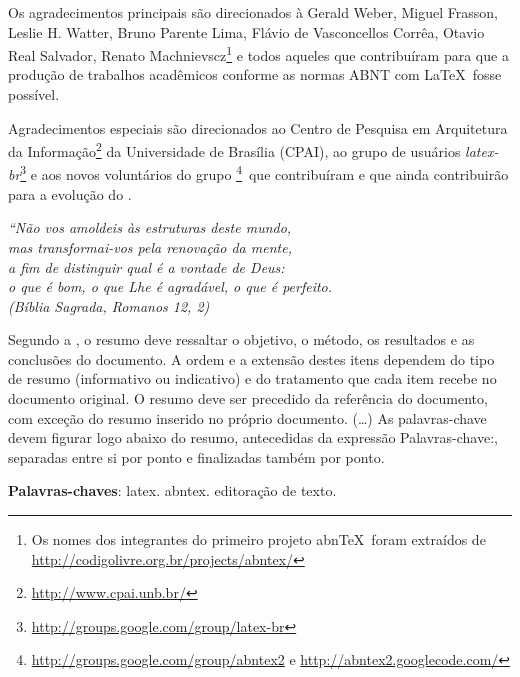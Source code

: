 \documentclass[
	12pt,				%
	openright,			%
	twoside,			%
	a4paper,			%
	english,			%
	french,				%
	spanish,			%
	brazil				%
	]{abntex2}
\begin{document}
\begin{agradecimentos}
Os agradecimentos principais são direcionados à Gerald Weber, Miguel Frasson,
Leslie H. Watter, Bruno Parente Lima, Flávio de Vasconcellos Corrêa, Otavio Real
Salvador, Renato Machnievscz\footnote{Os nomes dos integrantes do primeiro
projeto abn\TeX\ foram extraídos de
\url{http://codigolivre.org.br/projects/abntex/}} e todos aqueles que
contribuíram para que a produção de trabalhos acadêmicos conforme
as normas ABNT com \LaTeX\ fosse possível.

Agradecimentos especiais são direcionados ao Centro de Pesquisa em Arquitetura
da Informação\footnote{\url{http://www.cpai.unb.br/}} da Universidade de
Brasília (CPAI), ao grupo de usuários
\emph{latex-br}\footnote{\url{http://groups.google.com/group/latex-br}} e aos
novos voluntários do grupo
\emph{\abnTeX}\footnote{\url{http://groups.google.com/group/abntex2} e
\url{http://abntex2.googlecode.com/}}~que contribuíram e que ainda
contribuirão para a evolução do \abnTeX.

\end{agradecimentos}

\begin{epigrafe}
    \vspace*{\fill}
	\begin{flushright}
		\textit{``Não vos amoldeis às estruturas deste mundo, \\
		mas transformai-vos pela renovação da mente, \\
		a fim de distinguir qual é a vontade de Deus: \\
		o que é bom, o que Lhe é agradável, o que é perfeito.\\
		(Bíblia Sagrada, Romanos 12, 2)}
	\end{flushright}
\end{epigrafe}


\setlength{\absparsep}{18pt} %
\begin{resumo}
 Segundo a , o resumo deve ressaltar o
 objetivo, o método, os resultados e as conclusões do documento. A ordem e a extensão
 destes itens dependem do tipo de resumo (informativo ou indicativo) e do
 tratamento que cada item recebe no documento original. O resumo deve ser
 precedido da referência do documento, com exceção do resumo inserido no
 próprio documento. (\ldots) As palavras-chave devem figurar logo abaixo do
 resumo, antecedidas da expressão Palavras-chave:, separadas entre si por
 ponto e finalizadas também por ponto.

 \textbf{Palavras-chaves}: latex. abntex. editoração de texto.
\end{resumo}
\end{document}
